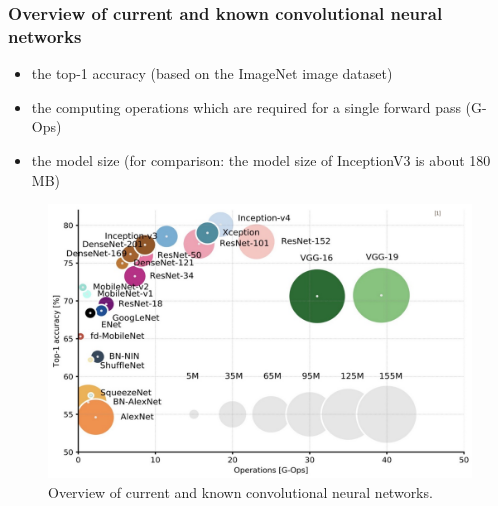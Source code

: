 \documentclass[10pt]{article}
\newif\ifen
\newif\ifde
\newcommand{\en}[1]{\ifen#1\fi}
\newcommand{\de}[1]{\ifde#1\fi}
\begin{document}
				\de{Welchen Vorteil ein vortrainiertes Netzwerk hat, kann man in dieser Arbeit im Kapitel ``\nameref{sec:section_use_of_the_transfer_learning_approach}" einsehen.}
				\en{The advantage of a pre-trained network can be seen in the chapter ``\nameref{sec:section_use_of_the_transfer_learning_approach}" of this thesis.}
			
			\subsubsection{Overview of current and known convolutional neural networks}
				\de{Zu guter Letzt folgen hier noch ein paar aktuelle und bekannte Convolutional Neuronal networks. Sie unterscheiden sich hauptsächlich in folgenden Metriken, wobei in Kombination jedes Netzwerk seine Vor- und Nachteile besitzt:}
				\en{Last but not least, here are a few current and well-known convolutional neural networks. They differ mainly in the following metrics, whereby in combination each network has its advantages and disadvantages:}

				\begin{itemize}
					\item the top-1 accuracy (based on the ImageNet image dataset)
					\item the computing operations which are required for a single forward pass (G-Ops)
					\item the model size (for comparison: the model size of InceptionV3 is about 180 MB)
				\end{itemize}
		
				\begin{figure}[H]
					\centering
					\includegraphics[width=1.0\textwidth]{images/tl_models}
					\caption[Overview of current and known convolutional neural networks.]{Overview of current and known convolutional neural networks.\footnotemark}
					\label{fig:beispiel5}
				\end{figure}
\end{document}
